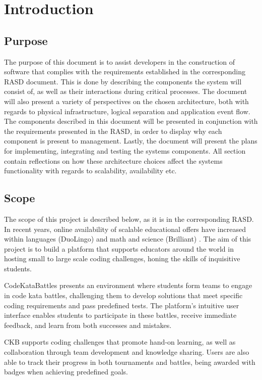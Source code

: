 \section{Introduction}
\label{sec:intro}


\subsection{Purpose}
The purpose of this document is to assist developers in the construction of software that complies with the requirements established in the corresponding RASD document. This is done by describing the components the system will consist of, as well as their interactions during critical processes. The document will also present a variety of perspectives on the chosen architecture, both with regards to physical infrastructure, logical separation and application event flow. The components described in this document will be presented in conjunction with the requirements presented in the RASD, in order to display why each component is present to management. Lastly, the document will present the plans for implementing, integrating and testing the systems components. 
All section contain reflections on how these architecture choices affect the systems functionality with regards to scalability, availability etc. 

\subsection{Scope}
The scope of this project is described below, as it is in the corresponding RASD. 
In recent years, online availability of scalable educational offers have increased within languages (DuoLingo) and math and science (Brilliant) . The aim of this project is to build a platform that supports educators around the world in hosting small to large scale coding challenges, honing the skills of inquisitive students. 

CodeKataBattles presents an environment where students form teams to engage in code kata battles, challenging them to develop solutions that meet specific coding requirements and pass predefined tests. The platform's intuitive user interface enables students to participate in these battles, receive immediate feedback, and learn from both successes and mistakes.

CKB supports coding challenges that promote hand-on learning, as well as collaboration through team development and knowledge sharing. Users are also able to track their progress in both tournaments and battles, being awarded with badges when achieving predefined goals. 

